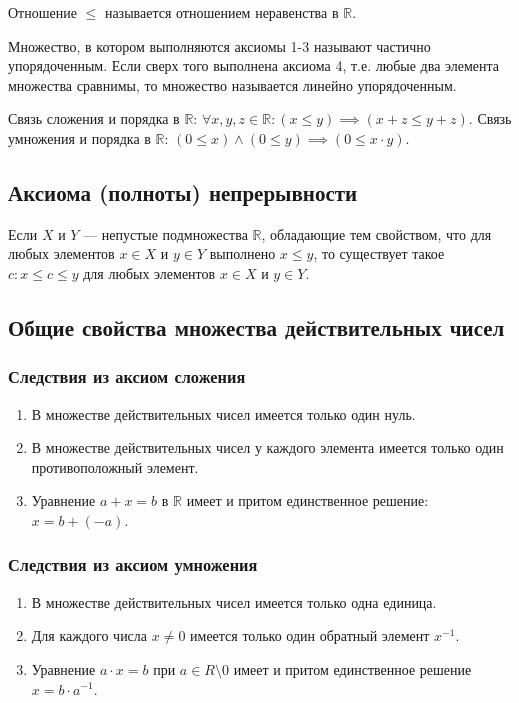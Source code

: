 \documentclass[12pt]{report}
\theoremstyle{definition}
\newcommand{\R}{\mathbb R}
\begin{document}
Отношение $\le$ называется отношением неравенства в $\R$.

Множество, в котором выполняются аксиомы 1-3 называют частично упорядоченным.
Если сверх того выполнена аксиома 4, т.е. любые два элемента множества сравнимы, то
множество называется линейно упорядоченным.

Связь сложения и порядка в $\R$: $\forall x, y, z \in \R: (x \le y) \implies (x + z \le y + z)$.
Связь умножения и порядка в $\R$: $(0 \le x) \land (0 \le y) \implies (0 \le x \cdot y)$.

\subsection{Аксиома (полноты) непрерывности}
Если $X$ и $Y$ --- непустые подмножества $\R$, обладающие тем свойством,
что для любых элементов $x \in X$ и $y \in Y$ выполнено $x \le y$,
то существует такое $c: x \le c \le y$ для любых элементов $x \in X$ и $y \in Y$.

\subsection{Общие свойства множества действительных чисел}

\subsubsection{Следствия из аксиом сложения}
\begin{enumerate}
\item В множестве действительных чисел имеется только один нуль.
\item В множестве действительных чисел у каждого элемента имеется
  только один противоположный элемент.
\item Уравнение $a + x = b$ в $\R$ имеет и притом единственное решение:
  $x = b + (-a)$.
\end{enumerate}

\subsubsection{Следствия из аксиом умножения}
\begin{enumerate}
\item В множестве действительных чисел имеется только одна единица.
\item Для каждого числа $x \ne 0$ имеется только один обратный элемент $x^{-1}$.
\item Уравнение $a \cdot x = b$ при $a \in R \setminus 0$ имеет и притом единственное
  решение $x = b \cdot a^{-1}$.
\end{enumerate}
\end{document}
